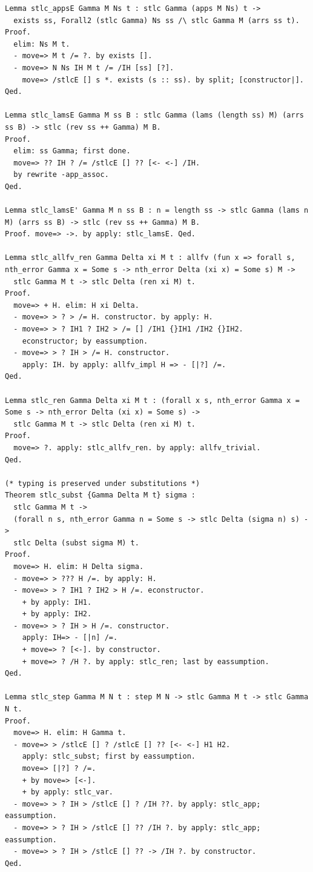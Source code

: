 \begin{lstlisting}
Lemma stlc_appsE Gamma M Ns t : stlc Gamma (apps M Ns) t ->
  exists ss, Forall2 (stlc Gamma) Ns ss /\ stlc Gamma M (arrs ss t).
Proof.
  elim: Ns M t.
  - move=> M t /= ?. by exists [].
  - move=> N Ns IH M t /= /IH [ss] [?].
    move=> /stlcE [] s *. exists (s :: ss). by split; [constructor|].
Qed.

Lemma stlc_lamsE Gamma M ss B : stlc Gamma (lams (length ss) M) (arrs ss B) -> stlc (rev ss ++ Gamma) M B.
Proof.
  elim: ss Gamma; first done.
  move=> ?? IH ? /= /stlcE [] ?? [<- <-] /IH.
  by rewrite -app_assoc.
Qed.

Lemma stlc_lamsE' Gamma M n ss B : n = length ss -> stlc Gamma (lams n M) (arrs ss B) -> stlc (rev ss ++ Gamma) M B.
Proof. move=> ->. by apply: stlc_lamsE. Qed.

Lemma stlc_allfv_ren Gamma Delta xi M t : allfv (fun x => forall s, nth_error Gamma x = Some s -> nth_error Delta (xi x) = Some s) M ->
  stlc Gamma M t -> stlc Delta (ren xi M) t.
Proof.
  move=> + H. elim: H xi Delta.
  - move=> > ? > /= H. constructor. by apply: H.
  - move=> > ? IH1 ? IH2 > /= [] /IH1 {}IH1 /IH2 {}IH2.
    econstructor; by eassumption.
  - move=> > ? IH > /= H. constructor.
    apply: IH. by apply: allfv_impl H => - [|?] /=.
Qed.

Lemma stlc_ren Gamma Delta xi M t : (forall x s, nth_error Gamma x = Some s -> nth_error Delta (xi x) = Some s) ->
  stlc Gamma M t -> stlc Delta (ren xi M) t.
Proof.
  move=> ?. apply: stlc_allfv_ren. by apply: allfv_trivial.
Qed.

(* typing is preserved under substitutions *)
Theorem stlc_subst {Gamma Delta M t} sigma :
  stlc Gamma M t ->
  (forall n s, nth_error Gamma n = Some s -> stlc Delta (sigma n) s) ->
  stlc Delta (subst sigma M) t.
Proof.
  move=> H. elim: H Delta sigma.
  - move=> > ??? H /=. by apply: H.
  - move=> > ? IH1 ? IH2 > H /=. econstructor.
    + by apply: IH1.
    + by apply: IH2.
  - move=> > ? IH > H /=. constructor.
    apply: IH=> - [|n] /=.
    + move=> ? [<-]. by constructor.
    + move=> ? /H ?. by apply: stlc_ren; last by eassumption.
Qed.

Lemma stlc_step Gamma M N t : step M N -> stlc Gamma M t -> stlc Gamma N t.
Proof.
  move=> H. elim: H Gamma t.
  - move=> > /stlcE [] ? /stlcE [] ?? [<- <-] H1 H2.
    apply: stlc_subst; first by eassumption.
    move=> [|?] ? /=.
    + by move=> [<-].
    + by apply: stlc_var.
  - move=> > ? IH > /stlcE [] ? /IH ??. by apply: stlc_app; eassumption.
  - move=> > ? IH > /stlcE [] ?? /IH ?. by apply: stlc_app; eassumption.
  - move=> > ? IH > /stlcE [] ?? -> /IH ?. by constructor.
Qed.


\end{lstlisting}
